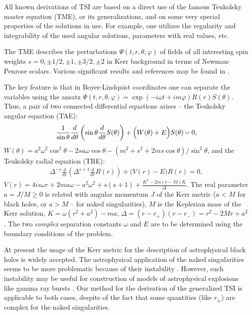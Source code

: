 \documentclass[prd,aps,twocolumn,leterpaper,preprintnumbers]{revtex4}
\numberwithin{equation}{section}
\newcommand{\ben}{\begin{eqnarray}}
\newcommand{\een}{\end{eqnarray}}
\newcommand{\la}{\label}
\begin{document}
All known derivations of TSI are based on a direct use of the famous
Teukolsky master equation (TME), or its generalizations,
and on some very special properties of the solutions in use. For example,
one utilizes the regularity and integrability of the used angular solutions,
parameters with real values, etc.

The TME describes the perturbations
$\Psi(t,r,\theta,\varphi)$ of fields of all interesting spin weights $s=0,
\pm 1/2, \pm 1, \pm 3/2, \pm 2$ in Kerr background in terms
of Newman-Penrose scalars. Various significant results and
references may be found in
\cite{Teukolsky,Starobinsky,Chandra,ChandraMT,other,TSI,TSIapplications,QNM}.

The key feature is that in Boyer-Lindquist coordinates
one can separate the variables using the ansatz
$\Psi(t,r,\theta,\varphi)=\exp(-i\omega t + im
\varphi)R(r)S(\theta)$.
Thus, a pair of two connected differential equations arises -- the Teukolsky
angular equation (TAE):
%
\ben {\frac {1}{\sin \theta}} {\frac {d}{d\theta}} \left( \sin
\theta {\frac {d} {d\theta}}S( \theta ) \right)
+\Big(W(\theta)+E\Big) S(\theta)\!=0, \hskip 0truecm \la{angE} \een
%
$W(\theta)\!=\!a^2\omega^2\!\cos^{2}\! \theta\!-\!2s a\omega \cos
\theta\! -\!(m^2\!+\!s^2\!+\!2ms\cos\theta)/\sin^2 \theta $, and the Teukolsky
radial equation (TRE):
%
\ben {\Delta}^{-s}{\frac {d }{dr}} \left( {\Delta}^{s+1}{ \frac
{d}{dr}}R(r)  \right) + \Big( V(r)-E \Big) R(r) =0, \la{radE} \een
%
$V(r)\!=\!4is\omega r+2 m a\omega-a^2\omega^2+s(s\!+\!1)\!+\!{\frac{K^2-2is\left(r-M\right)
K}\Delta}$.  The real parameter $a=J/M\geq 0$
is related with angular momentum $J$ of the Kerr metric
($a<M$ for black holes, or $a>M$ -- for naked singularities),
$M$ is the Keplerian mass of the Kerr solution, $K\!=\!\omega(r^2\!+\!a^2)\!-\!ma$,
$\Delta\!=\!(r\!-\!r_{+})(r\!-\!r_{-})\!=\!r^2\!-\!2Mr\!+\!a^2$.
The two {\em complex} separation constants $\omega$ and $E$ are
to be determined using the boundary conditions of the problem.

At present the usage of the Kerr metric for the description of astrophysical black holes is widely
accepted. The astrophysical application of the naked singularities seems to be more problematic
because of their instability \cite{VCMC}.
However, such instability may be useful for construction of models
of astrophysical explosions like gamma ray bursts \cite{STARA}.
Our method for the derivation of the generalized TSI is applicable to both cases,
despite of the fact that some quantities (like $r_\pm$)
are complex for the naked singularities.
\end{document}
